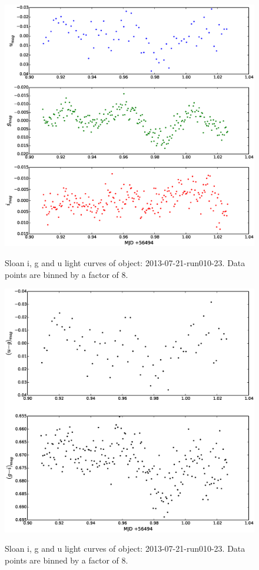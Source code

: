 \begin{figure}
  \center
  \includegraphics[width=120mm]{images/2013-07-21-run010-23_lightcurve-bin8.eps} \\
  \label{fig:2013-07-21-run010-23}
  \caption{Sloan i, g and u light curves of object: 2013-07-21-run010-23. Data points are binned by a factor of 8.}
\end{figure}

\begin{figure}
  \center
  \includegraphics[width=120mm]{images/2013-07-21-run010-23_colourcurve-bin8.eps} \\
  \label{fig:2013-07-21-run010-23-colour}
  \caption{Sloan i, g and u light curves of object: 2013-07-21-run010-23. Data points are binned by a factor of 8.}
\end{figure}



